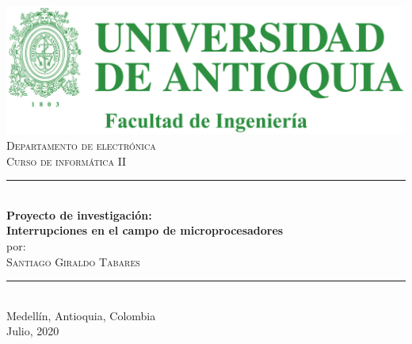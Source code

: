 \documentclass[12pt]{article}
\begin{document}
\begin{titlepage}
\BgThispage
\newcommand{\HRule}{\rule{\linewidth}{0.5mm}}
\center
\includegraphics[scale=0.4]{Escudo.jpg}\\[0.5 cm]
\textsc{\large Departamento de electrónica}\\[0.5cm]
\textsc{\large Curso de informática II}\\[0.5cm] 
\HRule \\[0.4cm]
{ \huge \bfseries Proyecto de investigación: \\[0.5 cm]\LARGE Interrupciones en el campo de microprocesadores}\\[0.4cm]
\large{por: }\\[0.3cm]
\textsc{Santiago Giraldo Tabares}\\
\HRule \\[1.5cm]
{\LARGE{Medellín, Antioquia, Colombia\\[0.2 cm]Julio, 2020}}\\
\vfill
\end{titlepage}
\end{document}

